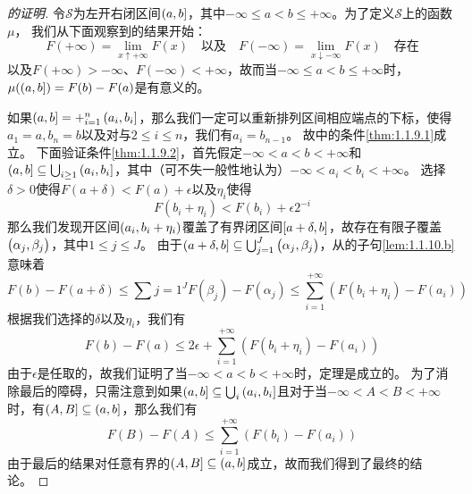 \documentclass[main.tex]{subfiles}
\begin{document}
\begin{proof}[的证明]
	令\(\mathcal{S}\)为左开右闭区间\(\intoc{a,b}\)，其中\(-\infty \leq a < b \leq +\infty\)。为了定义\(\mathcal{S}\)上的函数\(\mu\)，
	我们从下面观察到的结果开始：
	\[F(+\infty) = \lim\limits_{x \uparrow +\infty} F(x)\quad \text{以及}\quad
	F(-\infty) = \lim\limits_{x \downarrow -\infty} F(x)\quad\text{存在}\]
	以及\(F(+\infty) > -\infty\)、\(F(-\infty) < +\infty\)，故而当\(-\infty \leq a < b \leq +\infty\)时，\(\mu(\intoc{a, b}) = F(b) - F(a)\)是有意义的。

	如果\(\intoc{a, b} = +_{i=1}^{n}\intoc{a_i, b_i}\)，那么我们一定可以重新排列区间相应端点的下标，使得\(a_1 = a, b_n = b\)以及对与\(2 \leq i \leq n\)，我们有\(a_i = b_{n-1}\)。
	故中的条件\ref{thm:1.1.9.1}成立。
	下面验证条件\ref{thm:1.1.9.2}，首先假定\(-\infty < a < b < +\infty\)和\(\intoc{a, b} \subseteq \bigcup_{i \geq 1} \intoc{a_i, b_i}\)，其中（可不失一般性地认为）\(-\infty < a_i < b_i < +\infty\)。
	选择\(\delta > 0\)使得\(F(a + \delta) < F(a) + \epsilon\)以及\(\eta_i\)使得
	\[F(b_i + \eta_i) < F(b_i) + \epsilon 2^{-i}\]
	那么我们发现开区间\(\intoo{a_i, b_i + \eta_i}\)覆盖了有界闭区间\(\intcc{a + \delta, b}\)，故存在有限子覆盖\(\intoo{\alpha_j, \beta_j}\)，其中\(1 \leq j \leq J\)。
	由于\(\intoc{a + \delta, b} \subseteq \bigcup_{j=1}^J \intoo{\alpha_j, \beta_j}\)，从的子句\ref{lem:1.1.10.b}意味着
	\[F(b) - F(a+\delta) \leq \sum{j=1}^J F(\beta_j) - F(\alpha_j) \leq \sum_{i=1}^{+\infty}(F(b_i+\eta_i) - F(a_i))\]
	根据我们选择的\(\delta\)以及\(\eta_i\)，我们有
	\[F(b) - F(a) \leq 2\epsilon + \sum_{i=1}^{+\infty}(F(b_i+\eta_i) - F(a_i))\]
	由于\(\epsilon\)是任取的，故我们证明了当\(-\infty < a < b < +\infty\)时，定理是成立的。
	为了消除最后的障碍，只需注意到如果\(\intoc{a, b} \subseteq \bigcup_i \intoc{a_i, b_i}\)且对于当\(-\infty < A < B < +\infty\)时，有\(\intoc{A, B} \subseteq \intoc{a, b}\)，那么我们有
	\[F(B) - F(A) \leq \sum_{i=1}^{+\infty} (F(b_i) - F(a_i))\]
	由于最后的结果对任意有界的\(\intoc{A, B} \subseteq \intoc{a, b}\)成立，故而我们得到了最终的结论。
\end{proof}
\end{document}
